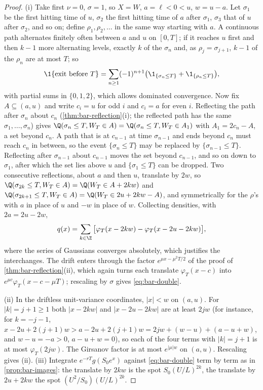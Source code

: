 \begin{proof}
(i) Take first $\nu=0$, $\sigma=1$, so $X=W$, $a=\ell<0<u$, $w=u-a$. Let $\sigma_1$ be the first
hitting time of $u$, $\sigma_2$ the first hitting time of $a$ after $\sigma_1$, $\sigma_3$ that of
$u$ after $\sigma_2$, and so on; define $\rho_1,\rho_2,\dots$ in the same way starting with $a$.
A continuous path alternates finitely often between $a$ and $u$ on $[0,T]$; if it reaches $u$
first and then $k-1$ more alternating levels, exactly $k$ of the $\sigma_n$ and, as
$\rho_j=\sigma_{j+1}$, $k-1$ of the $\rho_n$ are at most $T$; so
\[
  \1\{\text{exit before }T\}=\sum_{n\ge1}(-1)^{n+1}\big(\1_{\{\sigma_n\le T\}}+\1_{\{\rho_n\le T\}}\big),
\]
with partial sums in $\{0,1,2\}$, which allows dominated convergence. Now fix $A\subseteq(a,u)$
and write $c_i=u$ for odd $i$ and $c_i=a$ for even $i$. Reflecting the path after $\sigma_n$ about
$c_n$ (\cref{thm:bar-reflection}(i); the reflected path has the same $\sigma_1,\dots,\sigma_n$) gives
$\Q(\sigma_n\le T,W_T\in A)=\Q(\sigma_n\le T,W_T\in A_1)$ with $A_1=2c_n-A$, a set beyond $c_n$. A
path that is at $c_{n-1}$ at time $\sigma_{n-1}$ and ends beyond $c_n$ must reach $c_n$ in between,
so the event $\{\sigma_n\le T\}$ may be replaced by $\{\sigma_{n-1}\le T\}$. Reflecting after
$\sigma_{n-1}$ about $c_{n-1}$ moves the set beyond $c_{n-1}$, and so on down to $\sigma_1$, after which
the set lies above $u$ and $\{\sigma_1\le T\}$ can be dropped. Two consecutive reflections, about $a$
and then $u$, translate by $2w$, so
$\Q(\sigma_{2k}\le T,W_T\in A)=\Q(W_T\in A+2kw)$ and $\Q(\sigma_{2k+1}\le T,W_T\in A)=\Q(W_T\in 2u+2kw-A)$,
and symmetrically for the $\rho$'s with $a$ in place of $u$ and $-w$ in place of $w$. Collecting densities, with $2a=2u-2w$,
\[
  q(x)=\sum_{k\in\Z}\big[\varphi_T(x-2kw)-\varphi_T(x-2u-2kw)\big],
\]
where the series of Gaussians converges absolutely, which justifies the interchanges. The drift
enters through the factor $e^{\mu x-\mu^2T/2}$ of the proof of \cref{thm:bar-reflection}(ii), which
again turns each translate $\varphi_T(x-c)$ into $e^{\mu c}\varphi_T(x-c-\mu T)$; rescaling by
$\sigma$ gives \eqref{eq:bar-double}.

(ii) In the driftless unit-variance coordinates, $|x|<w$ on $(a,u)$. For $|k|=j+1\ge1$ both
$|x-2kw|$ and $|x-2u-2kw|$ are at least $2jw$ (for instance, for $k=-j-1$,
$x-2u+2(j+1)w>a-2u+2(j+1)w=2jw+(w-u)+(a-u+w)$, and $w-u=-a>0$, $a-u+w=0$), so each of the four terms
with $|k|=j+1$ is at most $\varphi_T(2jw)$. The Girsanov factor is at most $e^{|\mu|w}$ on
$(a,u)$. Rescaling gives (ii). (iii) Integrate $e^{-rT}g(S_0e^x)$ against
\eqref{eq:bar-double} term by term as in \cref{prop:bar-images}: the translate by $2kw$ is the
spot $S_0(U/L)^{2k}$, the translate by $2u+2kw$ the spot $(U^2/S_0)(U/L)^{2k}$.
\end{proof}

